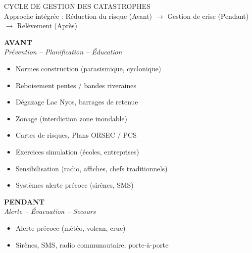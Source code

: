 \documentclass[11pt]{article}
\begin{document}
\begin{popfigure}
\begin{center}
{\popsemi\large\color{popdark} CYCLE DE GESTION DES CATASTROPHES}\\[2pt]
{\footnotesize\color{popmuted}Approche intégrée : Réduction du risque (Avant) $\rightarrow$ Gestion de crise (Pendant) $\rightarrow$ Relèvement (Après)}
\end{center}
\vspace{4pt}
\begin{tcbraster}[raster columns=3,raster equal height=rows,raster column skip=4mm]
\begin{tcolorbox}[enhanced,breakable=false,colback=popblue!10,colframe=popblue,boxrule=1pt,arc=4pt,
  left=6pt,right=6pt,top=5pt,bottom=5pt,halign=center]
{\bfseries\color{popblue}AVANT}\\[2pt]
{\scriptsize\emph{Prévention -- Planification -- Éducation}}\\[3pt]
{\scriptsize\begin{itemize}\setlength\itemsep{1pt}\setlength\parskip{0pt}\leftmargin=10pt
\item Normes construction (parasismique, cyclonique)
\item Reboisement pentes / bandes riveraines
\item Dégazage Lac Nyos, barrages de retenue
\item Zonage (interdiction zone inondable)
\item Cartes de risques, Plans ORSEC / PCS
\item Exercices simulation (écoles, entreprises)
\item Sensibilisation (radio, affiches, chefs traditionnels)
\item Systèmes alerte précoce (sirènes, SMS)
\end{itemize}}
\end{tcolorbox}
\begin{tcolorbox}[enhanced,breakable=false,colback=poporange!10,colframe=poporange,boxrule=1pt,arc=4pt,
  left=6pt,right=6pt,top=5pt,bottom=5pt,halign=center]
{\bfseries\color{poporange}PENDANT}\\[2pt]
{\scriptsize\emph{Alerte -- Évacuation -- Secours}}\\[3pt]
{\scriptsize\begin{itemize}\setlength\itemsep{1pt}\setlength\parskip{0pt}\leftmargin=10pt
\item Alerte précoce (météo, volcan, crue)
\item Sirènes, SMS, radio communautaire, porte-à-porte

\end{itemize}}
\end{tcolorbox}
\end{tcbraster}
\end{popfigure}
\end{document}
